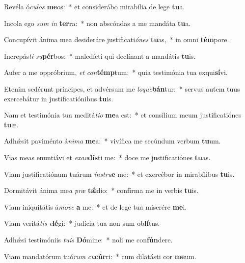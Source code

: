 \item Revéla ó\textit{cu}\textit{los} \textbf{me}os:~* et considerábo mirabília de lege \textbf{tu}a.
\item Incola ego \textit{sum} \textit{in} \textbf{ter}ra:~* non abscóndas a me mandáta \textbf{tu}a.
\item Concupívit ánima mea desideráre justificati\textit{ó}\textit{nes} \textbf{tu}as,~* in omni \textbf{tém}pore.
\item Increpás\textit{ti} \textit{su}\textbf{pér}bos:~* maledícti qui declínant a mandátis \textbf{tu}is.
\item Aufer a me oppróbrium, \textit{et} \textit{con}\textbf{témp}tum:~* quia testimónia tua exqui\textbf{sí}vi.
\item Etenim sedérunt príncipes, et advérsum me \textit{lo}\textit{que}\textbf{bán}tur:~* servus autem tuus exercebátur in justificatiónibus \textbf{tu}is.
\item Nam et testimónia tua meditá\textit{ti}\textit{o} \textbf{me}a est:~* et consílium meum justificatiónes \textbf{tu}æ.
\item Adhǽsit paviménto á\textit{ni}\textit{ma} \textbf{me}a:~* vivífica me secúndum verbum \textbf{tu}um.
\item Vias meas enuntiávi et \textit{ex}\textit{au}\textbf{dís}ti me:~* doce me justificatiónes \textbf{tu}as.
\item Viam justificatiónum tuárum \textit{ín}\textit{stru}\textbf{e} me:~* et exercébor in mirabílibus \textbf{tu}is.
\item Dormitávit ánima me\textit{a} \textit{præ} \textbf{tǽ}dio:~* confírma me in verbis \textbf{tu}is.
\item Viam iniquitátis á\textit{mo}\textit{ve} \textbf{a} me:~* et de lege tua miserére \textbf{me}i.
\item Viam veritá\textit{tis} \textit{e}\textbf{lé}gi:~* judícia tua non sum ob\textbf{lí}tus.
\item Adhǽsi testimóniis \textit{tu}\textit{is} \textbf{Dó}mine:~* noli me con\textbf{fún}dere.
\item Viam mandatórum tuó\textit{rum} \textit{cu}\textbf{cúr}ri:~* cum dilatásti cor \textbf{me}um.
